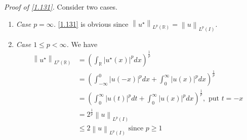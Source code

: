 \documentclass[a4paper,oneside]{book}
\numberwithin{equation}{chapter}
\begin{document}
\textit{Proof of \eqref{1.131}.} Consider two cases.
\begin{enumerate}
\item \textit{Case $p=\infty$.} \eqref{1.131} is obvious since ${\left\| {u^{\star}} \right\|_{{L^p}\left( \mathbb{R} \right)}} = {\left\| u \right\|_{{L^p}\left( I \right)}}$.
\item \textit{Case $1\le p <\infty$.} We have
\begin{align}
{\left\| {u^{\star}} \right\|_{{L^p}\left( \mathbb{R} \right)}} &= {\left( {\int_{\mathbb{R}} {{{\left| {u^{\star}\left( x \right)} \right|}^p}dx} } \right)^{\frac{1}{p}}}\\
 &= {\left( {\int_{ - \infty }^0 {{{\left| {u\left( { - x} \right)} \right|}^p}dx}  + \int_0^\infty  {{{\left| {u\left( x \right)} \right|}^p}dx} } \right)^{\frac{1}{p}}}\\
& = {\left( {\int_0^\infty  {{{\left| {u\left( t \right)} \right|}^p}dt}  + \int_0^\infty  {{{\left| {u\left( x \right)} \right|}^p}dx} } \right)^{\frac{1}{p}}},\mbox{ put } t =  - x\\
 &= {2^{\frac{1}{p}}}{\left\| u \right\|_{{L^p}\left( I \right)}}\label{1.135}\\
& \le 2{\left\| u \right\|_{{L^p}\left( I \right)}}\mbox{ since }p \ge 1
\end{align}
\end{enumerate}
\end{document}
